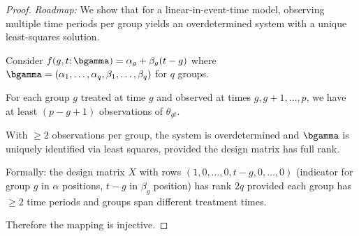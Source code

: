 \documentclass{article}
\begin{document}
\begin{proof}
\textit{Roadmap:} We show that for a linear-in-event-time model, observing multiple time periods per group yields an overdetermined system with a unique least-squares solution.

Consider $f(g,t;\bgamma) = \alpha_g + \beta_g(t-g)$ where $\bgamma = (\alpha_1,\ldots,\alpha_q, \beta_1,\ldots,\beta_q)$ for $q$ groups.

For each group $g$ treated at time $g$ and observed at times $g, g+1, \ldots, p$, we have at least $(p-g+1)$ observations of $\theta_{gt}$.

With $\geq 2$ observations per group, the system is overdetermined and $\bgamma$ is uniquely identified via least squares, provided the design matrix has full rank.

Formally: the design matrix $X$ with rows $(1, 0, \ldots, 0, t-g, 0, \ldots, 0)$ (indicator for group $g$ in $\alpha$ positions, $t-g$ in $\beta_g$ position) has rank $2q$ provided each group has $\geq 2$ time periods and groups span different treatment times.

Therefore the mapping is injective.
\end{proof}



\end{document}
